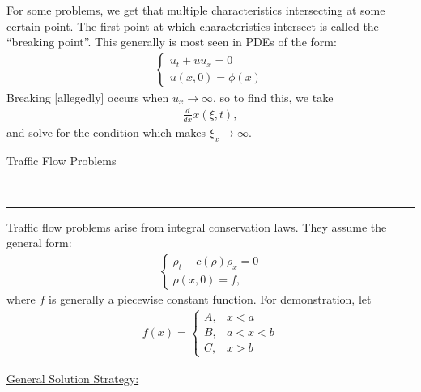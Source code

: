 \documentclass{article}
\newcommand{\header}[1]{\begin{large}\noindent #1\end{large}\\\rule{\textwidth}{0.5pt}}
\newcommand{\sheader}[1]{\underline{#1:}}
\newcommand{\gap}{\medskip\\}
\begin{document}
For some problems, we get that multiple characteristics intersecting at some 
certain point. The first point at which characteristics intersect is called 
the ``breaking point''. This generally is most seen in PDEs of the form:
\begin{align*}
    \begin{cases}
        u_t + uu_x = 0\\
        u(x, 0) = \phi(x)
    \end{cases}
\end{align*}
Breaking [allegedly] occurs when $u_x \to \infty$, so to find this, we take
\begin{align*}
    \frac{d}{dx} x(\xi, t),
\end{align*}
and solve for the condition which makes $\xi_x \to \infty$. 
\gap
\header{Traffic Flow Problems}
Traffic flow problems arise from integral conservation laws. They assume the 
general form:
\begin{align*}
    \begin{cases}
        \rho_t + c(\rho) \rho_x = 0\\
        \rho(x, 0) = f,
    \end{cases}
\end{align*}
where $f$ is generally a piecewise constant function. For demonstration, let 
\begin{align*}
    f(x) = \begin{cases}
        A, & x < a\\
        B, & a < x < b\\
        C, & x > b
    \end{cases}
\end{align*}

\sheader{General Solution Strategy}
\end{document}
